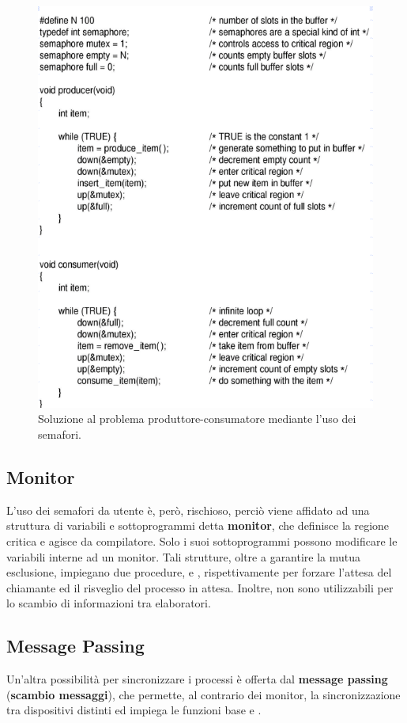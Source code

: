 \documentclass{article}
\begin{document}
\begin{figure}[H]
    \centering
    \includegraphics[scale=0.5]{solproduttoreconsumatore.png}
    \caption{Soluzione al problema produttore-consumatore mediante l'uso dei semafori.}
    \label{fig:sol-prod-cons-sem}
\end{figure}

\subsection{Monitor} L'uso dei semafori da utente è, però, rischioso, perciò viene affidato ad una struttura di variabili e sottoprogrammi detta \textbf{monitor}, che definisce la regione critica e agisce da compilatore. Solo i suoi sottoprogrammi possono modificare le variabili interne ad un monitor. Tali strutture, oltre a garantire la mutua esclusione, impiegano due procedure,  e , rispettivamente per forzare l'attesa del chiamante ed il risveglio del processo in attesa. Inoltre, non sono utilizzabili per lo scambio di informazioni tra elaboratori.

\subsection{Message Passing} Un'altra possibilità per sincronizzare i processi è offerta dal \textbf{message passing} (\textbf{scambio messaggi}), che permette, al contrario dei monitor, la sincronizzazione tra dispositivi distinti ed impiega le funzioni base  e .
\end{document}
